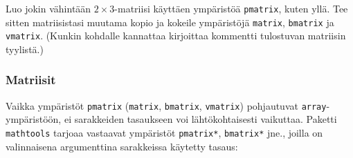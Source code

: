 \begin{frame}[fragile]
    \begin{harj}
        Luo jokin vähintään \(2\times 3\)-matriisi käyttäen ympäristöä \verb-pmatrix-, kuten yllä. Tee sitten matriisistasi muutama kopio ja kokeile ympäristöjä \verb-matrix-, \verb-bmatrix- ja \verb-vmatrix-. (Kunkin kohdalle kannattaa kirjoittaa kommentti tulostuvan matriisin tyylistä.)
    \end{harj}
\end{frame}
\begin{frame}[fragile]
    \frametitle{Matriisit}
    Vaikka ympäristöt \verb-pmatrix- (\verb-matrix-, \verb-bmatrix-, \verb-vmatrix-) pohjautuvat \verb-array--ympäristöön, ei sarakkeiden tasaukseen voi lähtökohtaisesti vaikuttaa. \vaihto Paketti \verb-mathtools- tarjoaa vastaavat ympäristöt \verb-pmatrix*-, \verb-bmatrix*- jne., joilla on valinnaisena argumenttina sarakkeissa käytetty tasaus:\vaihto


\end{frame}
